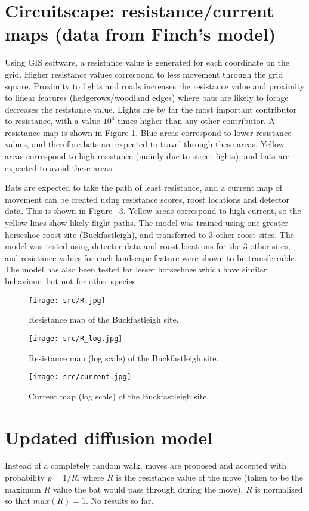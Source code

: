 
\section{Circuitscape: resistance/current maps (data from Finch's model)}

Using GIS software, a resistance value is generated for each coordinate on the grid. Higher resistance values correspond to less movement through the grid square. Proximity to lights and roads increases the resistance value and proximity to linear features (hedgerows/woodland edges) where bats are likely to forage decreases the resistance value. Lights are by far the most important contributor to resistance, with a value $10^4$ times higher than any other contributor. A resistance map is shown in Figure \ref{fig:resistance}. Blue areas correspond to lower resistance values, and therefore bats are expected to travel through these areas. Yellow areas correspond to high resistance (mainly due to street lights), and bats are expected to avoid these areas.

Bats are expected to take the path of least resistance, and a current map of
movement can be created using resistance scores, roost locations and detector
data. This is shown in Figure ~\ref{fig:current}. Yellow areas correspond to high current, so the yellow lines show likely flight paths. The model was trained using one greater horseshoe roost site (Buckfastleigh), and transferred to 3 other roost sites. The model was tested using detector data and roost locations for the 3 other sites, and resistance values for each landscape feature were shown to be transferrable. The model has also been tested for lesser horseshoes which have similar behaviour, but not for other species.

\begin{figure} 
    \centering
    \texttt{[image: src/R.jpg]}
    \caption{Resistance map of the Buckfastleigh site. }
    \label{fig:resistance}
\end{figure}
\begin{figure}
    \centering
    \texttt{[image: src/R\_log.jpg]}
    \caption{Resistance map (log scale) of the Buckfastleigh site.}
    \label{fig:resistance_log}
\end{figure}

\begin{figure}
    \centering
    \texttt{[image: src/current.jpg]}
    \caption{Current map (log scale) of the Buckfastleigh site.}
    \label{fig:current}
\end{figure}  


\section{Updated diffusion model}

Instead of a completely random walk, moves are proposed and accepted with probability $p = 1/R$, where $R$ is the resistance value of the move (taken to be the maximum $R$ value the bat would pass through during the move). $R$ is normalised so that $max(R) = 1$. 
No results so far.
